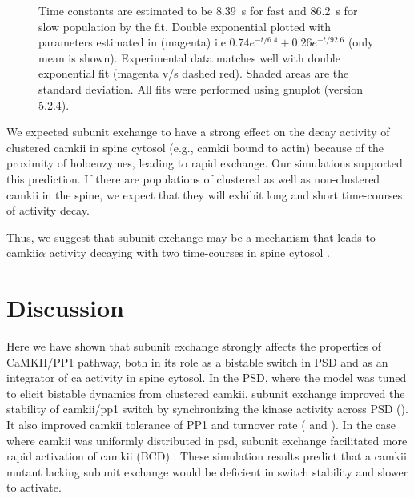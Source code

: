\documentclass[9pt,lineno,doublespacing]{elife}
\begin{document}
\begin{figure}
{        Time constants are estimated to be \SI{8.39}{\second} for fast and
        \SI{86.2}{\second} for slow population by the fit. Double exponential plotted
        with parameters estimated in \cite{chang_camkii_2017} (magenta) i.e
        $0.74e^{-t/6.4}+0.26e^{-t/92.6}$ (only mean is shown). Experimental data
        matches well with double exponential fit (magenta v/s dashed red).
        Shaded areas are the standard deviation. All fits were performed using
        gnuplot (version 5.2.4).
    }\label{fig:cytosol_integrator}
\end{figure}

We expected subunit exchange to have a strong effect on the decay activity of 
clustered \gls{camkii} in spine cytosol (e.g., \gls{camkii} bound to actin)
because of the proximity of holoenzymes, leading to rapid exchange. 
Our simulations supported this prediction. If there are populations of 
clustered as well as non-clustered \gls{camkii} in the spine, we expect that
they will exhibit long and short time-courses of activity decay.

Thus, we suggest that subunit exchange may be a mechanism that leads to
\gls{camkii}$\alpha$ activity decaying with two time-courses in spine 
cytosol \citep{chang_camkii_2017}.


\section{Discussion}\label{discussion}

Here we have shown that subunit exchange strongly affects the properties of
CaMKII/PP1 pathway, both in its role as a bistable switch in PSD and as an
integrator of \gls{ca} activity in spine cytosol. In the PSD, where the model was
tuned to elicit bistable dynamics from clustered \gls{camkii}, subunit exchange
improved the stability of \gls{camkii}/\gls{pp1} switch by synchronizing the
kinase activity across PSD (). It also improved
\gls{camkii} tolerance of PP1 and turnover rate (
and ). In the case where \gls{camkii} was uniformly
distributed in \gls{psd}, subunit exchange facilitated more rapid activation of
\gls{camkii} (BCD) 
\citep{stratton_activation-triggered_2014}.  These simulation results predict
that a \gls{camkii} mutant lacking subunit exchange would be deficient in 
switch stability and slower to activate.
\end{document}

